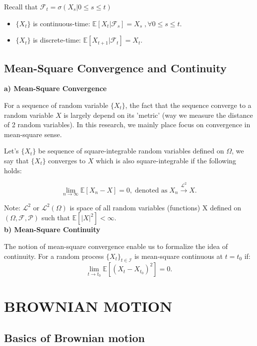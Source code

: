 \documentclass[12pt,a4paper,oneside]{book}
\begin{document}
	Recall that $\mathcal{F}_t= \sigma(X_s|0\leq s\leq t)$
	\begin{itemize}[label=$\bullet$]
		\item $\{X_t\}$ is continuous-time: $\mathbb{E}[X_t|\mathcal{F}_s]= X_s \; ,\forall 0\leq s\le t$.
		\item $\{X_t\}$ is discrete-time: $\mathbb{E}[X_{t+1}|\mathcal{F}_t]= X_t	$.
	    \end{itemize}

	\subsection{Mean-Square Convergence and Continuity}
	
	\textbf{a) Mean-Square Convergence}
	
	For a sequence of random variable $\{X_t\}$, the fact that the sequence converge to a random variable $X$ is largely depend on its 'metric' (way we measure the distance of 2 random variables). In this research, we mainly place focus on convergence in mean-square sense. 
	
	Let's $\{X_t\}$ be sequence of square-integrable random variables defined on $\Omega$, we say that $\{X_t\}$ converges to $X$ which is also square-integrable if the following holds:
	
	\begin{equation} \label{eqn: convergence}
	    \lim_{n \to \infty}\mathbb{E}[X_n-X]=0, \; \text{denoted as} \; X_n \xrightarrow{\mathcal{L}^2} X.
	\end{equation}
	
	Note: $\mathcal{L}^2$ or $\mathcal{L}^2(\Omega)$ is space of all random variables (functions) X defined on $(\Omega, \mathcal{F}, \mathcal{P})$ such that $\mathbb{E}[|X|^2]<\infty$.\\
	
	\textbf{b) Mean-Square Continuity}
	
	The notion of mean-square convergence enable us to formalize the idea of continuity. For a random process $\{X_t\}_{t\in \mathcal{I}}$ is mean-square continuous at $t=t_0$ if: 
	\begin{equation} \label{eqn: continuity}
	    \lim_{t \to t_0}\mathbb{E}[(X_t-X_{t_0})^2]= 0.
	\end{equation}

	
	\section{BROWNIAN MOTION}
	\subsection{Basics of Brownian motion}
	
\end{document}
